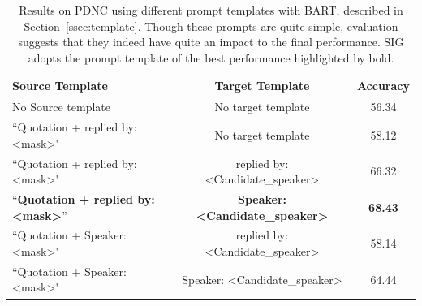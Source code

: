 \documentclass[letterpaper]{article} %
\begin{document}
\begin{table}[thbp!]
    \centering
    \begin{tabular}{l |c|c}

\toprule
       \textbf{Source Template} & \textbf{Target Template } & \textbf{Accuracy}\\
       \midrule  
       
       No Source template &No target template  & 56.34\\
       ``Quotation + replied by: \textless mask\textgreater" &No target template  & 58.12\\
       ``Quotation + replied by: \textless mask\textgreater" &  replied by:
   \textless Candidate\_speaker\textgreater  &66.32 \\
       ``\textbf{Quotation + replied by: \textless mask\textgreater}'' &\textbf{Speaker: \textless Candidate\_speaker\textgreater}  & \textbf{68.43}\\
       ``Quotation + Speaker: \textless mask\textgreater" & replied by: \textless Candidate\_speaker\textgreater  & 58.14\\
       ``Quotation + Speaker: \textless mask\textgreater" &Speaker: \textless Candidate\_speaker\textgreater & 64.44\\
       \bottomrule
  
    \end{tabular}
    \caption{Results on PDNC using different prompt templates with BART, described in Section~\ref{ssec:template}. Though these prompts are quite simple, evaluation suggests that they indeed have quite an impact to the final performance. SIG adopts the prompt template of the best performance highlighted by bold.}
    \label{tab:template}
    
\end{table}

\end{document}
